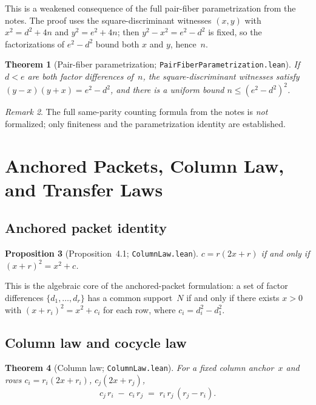 \documentclass[11pt,a4paper]{article}
\newtheorem{theorem}{Theorem}[section]
\newtheorem{proposition}[theorem]{Proposition}
\theoremstyle{definition}
\theoremstyle{remark}
\newtheorem{remark}[theorem]{Remark}
\begin{document}
This is a weakened consequence of the full pair-fiber parametrization
from the notes.  The proof uses the square-discriminant witnesses
$(x,y)$ with $x^2=d^2+4n$ and $y^2=e^2+4n$; then $y^2-x^2=e^2-d^2$
is fixed, so the factorizations of $e^2-d^2$ bound both $x$ and $y$,
hence~$n$.

\begin{theorem}[Pair-fiber parametrization; \texttt{PairFiberParametrization.lean}]
If $d<e$ are both factor differences of~$n$, the square-discriminant
witnesses satisfy $(y-x)(y+x)=e^2-d^2$, and there is a uniform bound
$n\le (e^2-d^2)^2$.
\end{theorem}

\begin{remark}
The full same-parity counting formula from the notes is \emph{not}
formalized; only finiteness and the parametrization identity are
established.
\end{remark}

\section{Anchored Packets, Column Law, and Transfer Laws}\label{sec:packet}

\subsection{Anchored packet identity}

\begin{proposition}[Proposition~4.1; \texttt{ColumnLaw.lean}]
$c = r(2x+r)$ if and only if $(x+r)^2 = x^2+c$.
\end{proposition}

This is the algebraic core of the anchored-packet formulation:
a set of factor differences $\{d_1,\dots,d_r\}$ has a common support~$N$
if and only if there exists $x>0$ with $(x+r_i)^2 = x^2+c_i$ for each row,
where $c_i = d_i^2-d_1^2$.

\subsection{Column law and cocycle law}

\begin{theorem}[Column law; \texttt{ColumnLaw.lean}]\label{thm:col-law}
For a fixed column anchor~$x$ and rows $c_i = r_i(2x+r_i)$,
$c_j(2x+r_j)$,
\[
  c_j\, r_i \;-\; c_i\, r_j \;=\; r_i\, r_j\,(r_j - r_i).
\]
\end{theorem}
\end{document}
